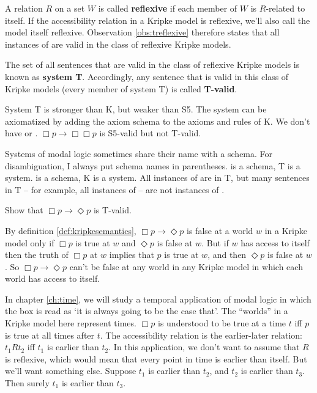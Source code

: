 A relation $R$ on a set $W$ is called \textbf{reflexive} if each member of $W$
is $R$-related to itself. If the accessibility relation in a Kripke model is
reflexive, we'll also call the model itself reflexive. Observation
\ref{obs:treflexive} therefore states that all instances of 
are valid in the class of reflexive Kripke models.

The set of all sentences that are valid in the class of reflexive Kripke models
is known as \textbf{system T}. Accordingly, any sentence that is valid in this
class of Kripke models (every member of system T) is called \textbf{T-valid}.


System T is stronger than K, but weaker than S5. The system can be axiomatized
by adding the axiom schema  to the axioms and rules of K. We don't have
 or . $\Box p \to \Box \Box p$ is S5-valid but not T-valid.

Systems of modal logic sometimes share their name with a schema. For
disambiguation, I always put schema names in parentheses.  is a schema, T
is a system.  is a schema, K is a system. All instances of  are in
T, but many sentences in T -- for example, all instances of  -- are not
instances of .

\begin{exercise}
  Show that $\Box p \to \Diamond p$ is T-valid.
\end{exercise}
\begin{solution}
  By definition \ref{def:kripkesemantics}, $\Box p \to \Diamond p$ is false at a
  world $w$ in a Kripke model only if $\Box p$ is true at $w$ and $\Diamond p$
  is false at $w$. But if $w$ has access to itself then the truth of $\Box p$ at $w$ implies that $p$ is true at $w$, and then $\Diamond p$ is false at $w$. So $\Box p \to \Diamond p$ can't be false at any world in any Kripke model in which each world has access to itself.
\end{solution}

In chapter \ref{ch:time}, we will study a temporal application of modal
logic in which the box is read as `it is always going to be the case that'.
The ``worlds'' in a Kripke model here represent times. $\Box p$ is
understood to be true at a time $t$ iff $p$ is true at all times after $t$. The
accessibility relation is the earlier-later relation: $t_1Rt_2$ iff $t_1$ is
earlier than $t_2$. In this application, we don't want to assume that $R$ is
reflexive, which would mean that every point in time is earlier than itself.
But we'll want something else. Suppose $t_1$ is earlier than $t_2$, and $t_2$ is
earlier than $t_3$. Then surely $t_1$ is earlier than $t_3$. 

